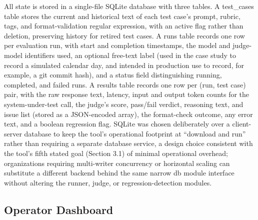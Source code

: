 \documentclass[11pt,a4paper]{article}
\begin{document}
All state is stored in a single-file SQLite database with three tables.
A test\_cases table stores the current and historical text of each test
case's prompt, rubric, tags, and format-validation
regular expression, with an active flag rather than deletion, preserving
history for retired test cases. A runs table records one row per
evaluation run, with start and completion timestamps, the model and
judge-model identifiers used, an optional free-text label (used in the
case study to record a simulated calendar day, and intended in
production use to record, for example, a git commit hash), and a status
field distinguishing running, completed, and failed runs. A results
table records one row per (run, test case) pair, with the raw response
text, latency, input and output token counts for the system-under-test
call, the judge's score, pass/fail verdict, reasoning
text, and issue list (stored as a JSON-encoded array), the format-check
outcome, any error text, and a boolean regression flag. SQLite was
chosen deliberately over a client-server database to keep the
tool's operational footprint at ``download and run''
rather than requiring a separate database service, a design choice
consistent with the tool's fifth stated goal (Section
3.1) of minimal operational overhead; organizations requiring
multi-writer concurrency or horizontal scaling can substitute a
different backend behind the same narrow db module interface without
altering the runner, judge, or regression-detection modules.

\subsection{Operator Dashboard}
\end{document}
